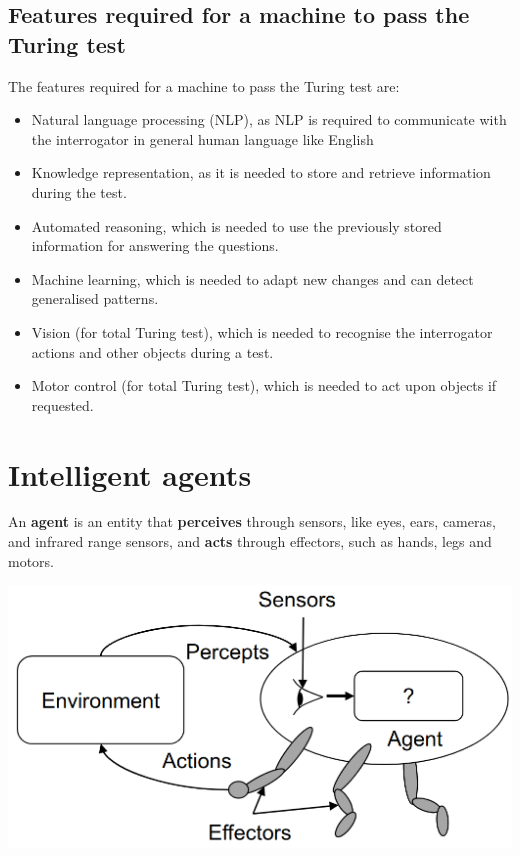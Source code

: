 \documentclass[11pt]{article}
\begin{document}
\subsection{Features required for a machine to pass the Turing test}
\label{sec:orgdc66f04}
The features required for a machine to pass the Turing test are:
\begin{itemize}
\item Natural language processing (NLP), as NLP is required to communicate with the interrogator in general human language like English
\item Knowledge representation, as it is needed to store and retrieve information during the test.
\item Automated reasoning, which is needed to use the previously stored information for answering the questions.
\item Machine learning, which is needed to adapt new changes and can detect generalised patterns.
\item Vision (for total Turing test), which is needed to recognise the interrogator actions and other objects during a test.
\item Motor control (for total Turing test), which is needed to act upon objects if requested.
\end{itemize}

 \newpage
\section{Intelligent agents}
\label{sec:org48d830a}
An \textbf{agent} is an entity that \textbf{perceives} through sensors, like eyes, ears, cameras, and infrared range sensors, and \textbf{acts} through effectors, such as hands, legs and motors.

\begin{center}
\includegraphics[width=.9\linewidth]{./images/agent-diagram.png}
\end{center}
\end{document}
